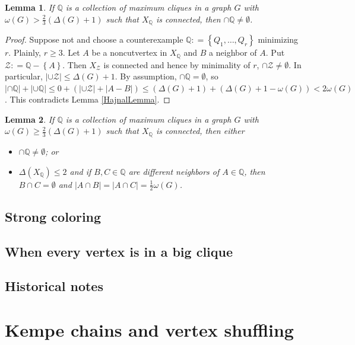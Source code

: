 \documentclass[openany]{tufte-book} %
\theoremstyle{plain}
\newtheorem{lemma}{Lemma}
\newcommand{\set}[1]{\left\{ #1 \right\}}
\newcommand{\card}[1]{\left|#1\right|}
\newcommand{\DefinedAs}{\mathrel{\mathop:}=}
\newcommand{\Q}{\mathbb{Q}}
\newcommand{\fancy}[1]{\mathcal{#1}}
\begin{document}
\begin{lemma}\label{KostochkaCliqueGraph}
If $\Q$ is a collection of maximum cliques in a graph $G$ with $\omega(G) > \frac23 (\Delta(G) + 1)$ such that $X_\Q$ is connected, then $\cap \Q \neq \emptyset$. 
\end{lemma}
\begin{proof}
Suppose not and choose a counterexample $\Q \DefinedAs \set{Q_1, \ldots, Q_r}$
minimizing $r$. Plainly, $r \geq 3$. Let $A$ be a noncutvertex in $X_{\Q}$ and
$B$ a neighbor of $A$. Put $\fancy{Z} \DefinedAs \Q - \set{A}$. Then
$X_{\fancy{Z}}$ is connected and hence by minimality of $r$, $\cap \fancy{Z}
\neq \emptyset$. In particular, $\card{\cup \fancy{Z}} \leq \Delta(G) + 1$.
By assumption, $\cap\Q=\emptyset$, so $\card{\cap \Q} + \card{\cup \Q} \leq 0 +
(\card{\cup \fancy{Z}} + \card{A - B}) \leq
(\Delta(G) + 1) + (\Delta(G)+1 - \omega(G)) < 2\omega(G)$. This contradicts
Lemma \ref{HajnalLemma}.
\end{proof}

\begin{lemma}\label{TwoThirdsEqualityStructure}
If $\Q$ is a collection of maximum cliques in a graph $G$ with $\omega(G) \ge \frac23 (\Delta(G) + 1)$ such that $X_\Q$ is connected, then either 
\begin{itemize}
\item $\cap \Q \ne \emptyset$; or
\item $\Delta(X_\Q) \le 2$ and if $B, C \in \Q$ are different neighbors of $A \in \Q$, then $B \cap C = \emptyset$ and $\card{A \cap B} = \card{A \cap C} = \frac12 \omega(G)$.
\end{itemize}
\end{lemma}

\section{Strong coloring}
\section{When every vertex is in a big clique}
\section{Historical notes}

\chapter{Kempe chains and vertex shuffling}
\end{document}
